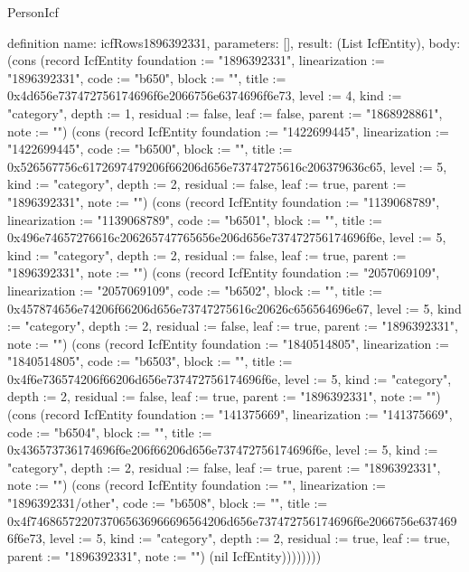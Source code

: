 \begin{lexlean}{PersonIcf}
\begin{semanticmodule}
definition{
  name: icfRows1896392331,
  parameters: [],
  result: (List IcfEntity),
  body: (cons (record IcfEntity {foundation := "1896392331", linearization := "1896392331", code := "b650", block := "", title := 0x4d656e737472756174696f6e2066756e6374696f6e73, level := 4, kind := "category", depth := 1, residual := false, leaf := false, parent := "1868928861", note := ""}) (cons (record IcfEntity {foundation := "1422699445", linearization := "1422699445", code := "b6500", block := "", title := 0x526567756c6172697479206f66206d656e73747275616c206379636c65, level := 5, kind := "category", depth := 2, residual := false, leaf := true, parent := "1896392331", note := ""}) (cons (record IcfEntity {foundation := "1139068789", linearization := "1139068789", code := "b6501", block := "", title := 0x496e74657276616c206265747765656e206d656e737472756174696f6e, level := 5, kind := "category", depth := 2, residual := false, leaf := true, parent := "1896392331", note := ""}) (cons (record IcfEntity {foundation := "2057069109", linearization := "2057069109", code := "b6502", block := "", title := 0x457874656e74206f66206d656e73747275616c20626c656564696e67, level := 5, kind := "category", depth := 2, residual := false, leaf := true, parent := "1896392331", note := ""}) (cons (record IcfEntity {foundation := "1840514805", linearization := "1840514805", code := "b6503", block := "", title := 0x4f6e736574206f66206d656e737472756174696f6e, level := 5, kind := "category", depth := 2, residual := false, leaf := true, parent := "1896392331", note := ""}) (cons (record IcfEntity {foundation := "141375669", linearization := "141375669", code := "b6504", block := "", title := 0x436573736174696f6e206f66206d656e737472756174696f6e, level := 5, kind := "category", depth := 2, residual := false, leaf := true, parent := "1896392331", note := ""}) (cons (record IcfEntity {foundation := "", linearization := "1896392331/other", code := "b6508", block := "", title := 0x4f7468657220737065636966696564206d656e737472756174696f6e2066756e6374696f6e73, level := 5, kind := "category", depth := 2, residual := true, leaf := true, parent := "1896392331", note := ""}) (nil IcfEntity))))))))
}


\end{semanticmodule}
\end{lexlean}
